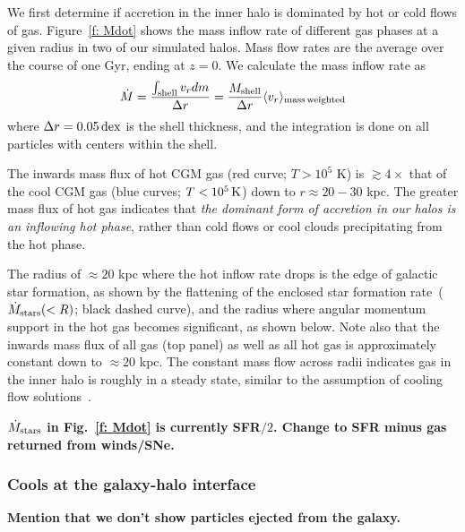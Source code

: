 \documentclass[fleqn,usenatbib]{mnras}
\newcommand{\Mdot}{\dot{M}}
\begin{document}
We first determine if accretion in the inner halo is dominated by hot or cold flows of gas.
Figure~\ref{f: Mdot} shows the mass inflow rate of different gas phases at a given radius in two of our simulated halos.
Mass flow rates are the average over the course of one Gyr, ending at $z=0$.
We calculate the mass inflow rate as
\begin{equation}
     \Mdot = \frac{\int_{\rm shell} v_r dm}{\Delta r} = \frac{M_{\rm shell}}{\Delta r} \langle v_r\rangle_{\rm mass\, weighted}
     \label{e: Mdot}
\end{equation}
where $\Delta r=0.05\,{\rm dex}$ is the shell thickness, and the integration is done on all particles with centers within the shell.

The inwards mass flux of hot CGM gas (red curve; $T>10^5$ K)  is $\gtrsim 4\times$ that of the cool CGM gas (blue curves; $T < 10^5\,{\rm K}$) down to $r \approx 20-30$ kpc.
The greater mass flux of hot gas indicates that \textit{the dominant form of accretion in our halos is an inflowing hot phase}, rather than cold flows or cool clouds precipitating from the hot phase. 

The radius of $\approx 20$ kpc where the hot inflow rate drops is the edge of galactic star formation, as shown by the flattening of the enclosed star formation rate~($\dot M_{\rm stars}(<R)$; black dashed curve), and the radius where angular momentum support in the hot gas becomes significant, as shown below. 
Note also that the inwards mass flux of all gas (top panel) as well as all hot gas is approximately constant down to $\approx 20$ kpc.
The constant mass flow across radii indicates gas in the inner halo is roughly in a steady state, similar to the assumption of cooling flow solutions~\citep{Stern2019}.

\textbf{$\dot{M}_{\rm stars}$ in Fig.~\ref{f: Mdot} is currently SFR$/2$. Change to SFR minus gas returned from winds/SNe.}

\subsubsection{Cools at the galaxy-halo interface}
\label{s: characteristics -- cools}

\textbf{Mention that we don't show particles ejected from the galaxy.}
\end{document}
